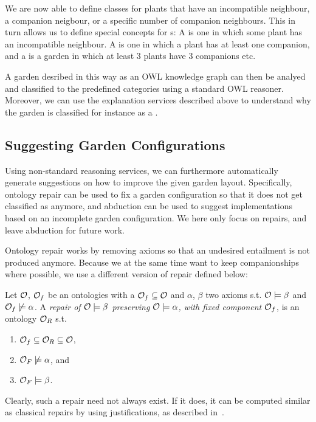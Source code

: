 We are now able to define classes for plants that have an incompatible neighbour, a companion
neigbour, or a specific number of companion neighbours. This in turn allows us to define
special concepts for s: A  is one in which some plant has an
incompatible neighbour. A  is one in which a plant has at least one
companion, and a  is a garden in which at least 3 plants have
3 companions etc.

A garden desribed in this way as an OWL knowledge graph can then be analyed and classified to
the predefined categories using a standard OWL reasoner. Moreover, we can use the explanation
services described above to understand why the garden is classified for instance as a
.

\subsection{Suggesting Garden Configurations}

Using non-standard reasoning services, we can furthermore automatically generate suggestions
on how to improve the given garden layout. Specifically, ontology repair can be used to
fix a garden configuration so that it does not get classified as  anymore, and
abduction can be used to suggest implementations based on an incomplete garden configuration.
We here only focus on repairs, and leave abduction for future work.

Ontology repair works by removing axioms so that an undesired entailment is not produced
anymore. Because we at the same time want to keep companionships where possible, we use
a different version of repair defined below:
\begin{definition}
 Let $\mathcal{O}$, $\mathcal{O}_f$ be an ontologies with a $\mathcal{O}_f\subseteq\mathcal{O}$
 and $\alpha$, $\beta$ two axioms s.t. $\mathcal{O}\models\beta$ and $\mathcal{O}_f\not\models\alpha$.
 A \emph{repair of $\mathcal{O}\models\beta$ preserving $\mathcal{O}\models\alpha$, with fixed
 component $\mathcal{O}_f$}, is an ontology $\mathcal{O}_R$ s.t.
 \begin{enumerate}
  \item $\mathcal{O}_f\subseteq\mathcal{O}_R\subseteq\mathcal{O}$,
  \item $\mathcal{O}_F\not\models\alpha$, and
  \item $\mathcal{O}_F\models\beta$.
 \end{enumerate}
\end{definition}
Clearly, such a repair need not always exist. If it does, it can be computed similar
as classical repairs by using justifications, as described in~\cite{XX}.

